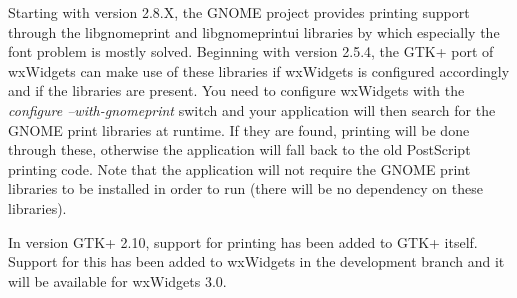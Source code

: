 Starting with version 2.8.X, the GNOME project provides printing
support through the libgnomeprint and libgnomeprintui libraries
by which especially the font problem is mostly solved. Beginning
with version 2.5.4, the GTK+ port of wxWidgets can make use of
these libraries if wxWidgets is configured accordingly and if the
libraries are present. You need to configure wxWidgets with the
{\it configure --with-gnomeprint} switch and your application will
then search for the GNOME print libraries at runtime. If they
are found, printing will be done through these, otherwise the
application will fall back to the old PostScript printing code.
Note that the application will not require the GNOME print libraries
to be installed in order to run (there will be no dependency on
these libraries).

In version GTK+ 2.10, support for printing has been added to GTK+ 
itself. Support for this has been added to wxWidgets in the
development branch and it will be available for wxWidgets 3.0.

